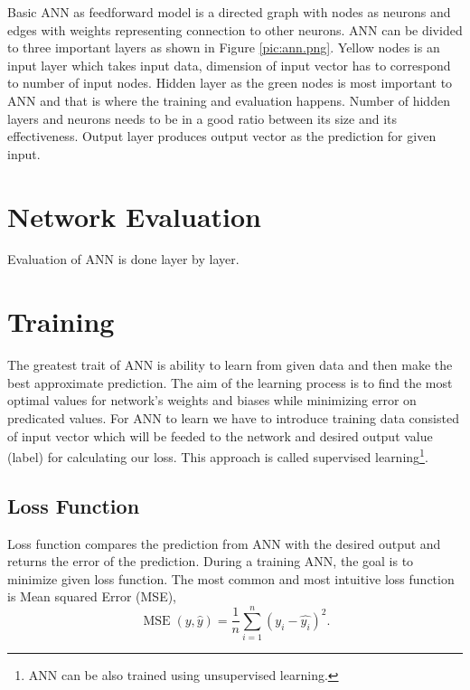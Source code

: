 
Basic ANN as feedforward model is a directed graph with nodes as neurons and edges with weights representing connection to other neurons.
ANN can be divided to three important layers as shown in Figure \ref{pic:ann.png}.
Yellow nodes is an input layer which takes input data, dimension of input vector has to correspond to number of input nodes.
Hidden layer as the green nodes is most important to ANN and that is where the training and evaluation happens.
Number of hidden layers and neurons needs to be in a good ratio between its size and its effectiveness.
Output layer produces output vector as the prediction for given input.


\section{Network Evaluation}

Evaluation of ANN is done layer by layer.


\section{Training}

The greatest trait of ANN is ability to learn from given data and then make the best approximate prediction.
The aim of the learning process is to find the most optimal values for network's weights and biases while minimizing error on predicated values.
For ANN to learn we have to introduce training data consisted of input vector which will be feeded to the network and desired output value (label) for calculating our loss.
This approach is called supervised learning\footnote{\label{note1}ANN can be also trained using unsupervised learning.}.
\newline

\subsection{Loss Function}

Loss function compares the prediction from ANN with the desired output and returns the error of the prediction.
During a training ANN, the goal is to minimize given loss function.
The most common and most intuitive loss function is Mean squared Error (MSE),
\[ \operatorname{MSE}(y, \hat{y}) = \frac{1}{n}\sum_{i=1}^n(y_i-\hat{y_i})^2. \]


